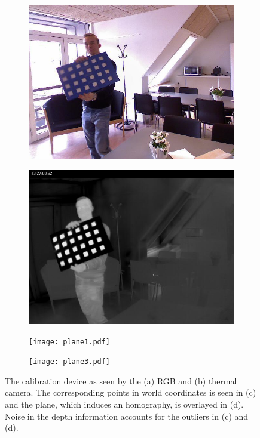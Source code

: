 \documentclass[10pt,twocolumn,letterpaper]{article}
\begin{document}
\begin{figure}[htpb]
\centering
\begin{subfigure}[b]{0.48\columnwidth}
	\includegraphics[width=\columnwidth]{RGB00064.png}%
	\caption{}
\end{subfigure}
\begin{subfigure}[b]{0.48\columnwidth}
	\includegraphics[width=\columnwidth]{T00064.jpg}%
	\caption{}%
\end{subfigure}
\begin{subfigure}[b]{0.48\columnwidth}
	\texttt{[image: plane1.pdf]}%
	\caption{}
\end{subfigure}
\begin{subfigure}[b]{0.48\columnwidth}
	\texttt{[image: plane3.pdf]}%
	\caption{}%
\end{subfigure}
\caption{The calibration device as seen by the (a) RGB and (b) thermal camera. The corresponding points in world coordinates is seen in (c) and the plane, which induces an homography, is overlayed in (d). Noise in the depth information accounts for the outliers in (c) and (d).}
\label{fig:calibrationDevice}
\end{figure}
\end{document}
